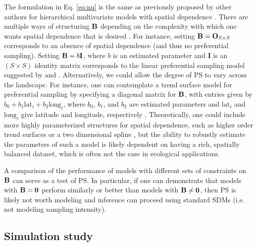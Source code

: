 \documentclass[times,mee,doublespace,]{besauth2}
\begin{document}
 The formulation in Eq. \ref{eq:nu} is the same as previously proposed by other authors for hierarchical multivariate models with spatial dependence \citep[cf.][]{RoyleBerliner1999}.  There are multiple ways of structuring ${\bf B}$ depending on the complexity with which one wants spatial dependence that is desired \citep{RoyleBerliner1999}.  For instance, setting ${\bf B} = {\bf O}_{S \times S}$ corresponds to an absence of spatial dependence (and thus no preferential sampling).  Setting ${\bf B} = b {\bf I}$, where $b$ is an estimated parameter and {\bf I} is an $(S \times S)$ identity matrix corresponds to the linear preferential sampling model suggested by \citet{DiggleEtAl2010} and \citet{PatiEtAl2011}.  Alternatively, we could allow the degree of PS to vary across the landscape.  For instance, one can contemplate a trend surface model for preferential sampling by specifying a diagonal matrix for ${\bf B}$, with entries given by $b_0 + b_1 \textrm{lat}_i + b_2 \textrm{long}_i$, where $b_0$, $b_1$, and $b_2$ are estimated parameters and $\textrm{lat}_i$ and $\textrm{long}_i$ give latitude and longitude, respectively \citep{RoyleBerliner1999}.  Theoretically, one could include more highly parameterized structures for spatial dependence, such as higher order trend surfaces or a two dimensional spline \citep{RoyleBerliner1999,UnpublishedManuscript}, but the ability to robustly estimate the parameters of such a model is likely dependent on having a rich, spatially balanced dataset, which is often not the case in ecological applications.
 
A comparison of the performance of models with different sets of constraints on ${\bf B}$ can serve as a test of PS.  In particular, if one can demonstrate that models with ${\bf B}={\bf 0}$ perform similarly or better than models with ${\bf B} \ne {\bf 0}$, then PS is likely not worth modeling and inference can proceed using standard SDMs (i.e. not modeling sampling intensity).


\subsection{Simulation study}
\end{document}
